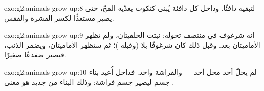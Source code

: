 \begin{solution}{exo:g2:animals-grow-up:8}
لتبقيه دافئًا. وداخل كل  دافئة يُبنى كتكوت يغذّيه المحّ، حتى
يصير مستعدًّا لكسر القشرة والفقس.
\end{solution}

\begin{solution}{exo:g2:animals-grow-up:9}
إنه شرغوف في منتصف تحوله: نبتت  الخلفيتان، ولم تظهر
الأماميتان بعد. وقبل ذلك كان شرغوفًا بلا  (وقبله )؛ ثم
ستظهر  الأماميتان، ويضمر الذنب، فيصير ضفدعًا صغيرًا.
\end{solution}

\begin{solution}{exo:g2:animals-grow-up:10}
لم يحلّ أحد محل أحد ---  والفراشة  واحد. فداخل
 أُعيد بناء جسم  ليصير جسم فراشة: وذلك البناء من
جديد هو معنى .
\end{solution}
